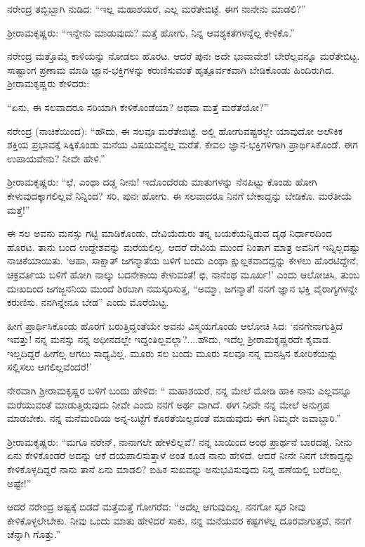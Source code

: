 ನರೇಂದ್ರ ತಬ್ಬಿಬ್ಬಾಗಿ ನುಡಿದ: “ಇಲ್ಲ ಮಹಾಶಯರೆ, ಎಲ್ಲ ಮರೆತೇಬಿಟ್ಟೆ. ಈಗ ನಾನೇನು ಮಾಡಲಿ?”

ಶ್ರೀರಾಮಕೃಷ್ಣರು: “ಇನ್ನೇನು ಮಾಡುವುದು? ಮತ್ತೆ ಹೋಗು, ನಿನ್ನ ಆವಶ್ಯಕತೆಗಳನ್ನೆಲ್ಲ ಕೇಳಿಕೊ.”

ನರೇಂದ್ರ ಮತ್ತೊಮ್ಮೆ ಕಾಳಿಯನ್ನು ನೋಡಲು ಹೊರಟ. ಆದರೆ ಪುನಃ ಅದೇ ಭಾವಾವೇಶ! ಬೇರೆಲ್ಲವನ್ನೂ ಮರೆತೇಬಿಟ್ಟ. ಸಾಷ್ಟಾಂಗ ಪ್ರಣಾಮ ಮಾಡಿ ಜ್ಞಾನ-ಭಕ್ತಿಗಳನ್ನು ಕರುಣಿಸುವಂತೆ ಹೃತ್ಪೂರ್ವಕವಾಗಿ ಬೇಡಿಕೊಂಡು ಹಿಂದಿರುಗಿದ. ಶ್ರೀರಾಮಕೃಷ್ಣರು ಕೇಳಿದರು:

“ಏನು, ಈ ಸಲವಾದರೂ ಸರಿಯಾಗಿ ಕೇಳಿಕೊಂಡೆಯಾ? ಅಥವಾ ಮತ್ತೆ ಮರೆತೆಯೋ?”

ನರೇಂದ್ರ (ನಾಚಿಕೆಯಿಂದ): “ಹೌದು, ಈ ಸಲವೂ ಮರೆತೇಬಿಟ್ಟೆ. ಅಲ್ಲಿ ಹೋಗುವಷ್ಟರಲ್ಲೇ ಯಾವುದೋ ಅಲೌಕಿಕ ಶಕ್ತಿಯ ಪ್ರಭಾವಕ್ಕೆ ಸಿಕ್ಕಿಕೊಂಡು ಮನೆಯ ವಿಷಯವನ್ನೆಲ್ಲ ಮರೆತೆ. ಕೇವಲ ಜ್ಞಾನ-ಭಕ್ತಿಗಳಿಗಾಗಿ ಪ್ರಾರ್ಥಿಸಿಕೊಂಡೆ. ಈಗ ಉಪಾಯವೇನು? ನೀವೇ ಹೇಳಿ.”

ಶ್ರೀರಾಮಕೃಷ್ಣರು: “ಛೆ, ಎಂಥಾ ದಡ್ಡ ನೀನು! ಇದೊಂದೆರಡು ಮಾತುಗಳನ್ನು ನೆನಪಿಟ್ಟು ಕೊಂಡು ಹೋಗಿ ಕೇಳುವುದಕ್ಕಾಗಲಿಲ್ಲವೆ ನಿನ್ನಿಂದ? ಸರಿ, ಪುನಃ ಹೋಗು. ಈ ಸಲವಾದರೂ ನಿನಗೆ ಬೇಕಾದ್ದನ್ನು ಬೇಡಿಕೊ. ಮರೆತೀಯೆ ಮತ್ತೆ!”

ಈ ಸಲ ಅವನು ಮನಸ್ಸು ಗಟ್ಟಿ ಮಾಡಿಕೊಂಡು, ದೇವಿಯೆದುರು ತನ್ನ ಬಯಕೆಯನ್ನಿಡುವ ದೃಢ ನಿರ್ಧಾರದಿಂದ ಹೊರಟ. ತಾನು ಬಂದ ಉದ್ದೇಶವನ್ನು ಮರೆಯಲಿಲ್ಲ. ಆದರೆ ದೇವಿಯ ಮುಂದೆ ನಿಂತಾಗ ಮಾತ್ರ ಅವನಿಗೆ ಇನ್ನಿಲ್ಲದಷ್ಟು ನಾಚಿಕೆಯಾಯಿತು. ‘ಆಹಾ, ಸಾಕ್ಷಾತ್ ಜಗನ್ಮಾತೆಯ ಬಳಿಗೆ ಬಂದು ಎಂಥಾ ಕ್ಷುಲ್ಲಕವಾದದ್ದನ್ನು ಕೇಳಲು ಹೊರಟಿದ್ದೇನೆ, ಚಕ್ರವರ್ತಿಯ ಬಳಿಗೆ ಹೋಗಿ ನಾಲ್ಕು ಬದನೇಕಾಯಿ ಕೇಳುವಂತೆ! ಛಿ, ನಾನೆಂಥ ಮೂರ್ಖ!’ ಎಂದು ಆಲೋಚಿಸಿ, ತುಂಬ ದುಃಖದಿಂದ ಜಗಜ್ಜನನಿಯ ಮುಂದೆ ಶಿರಬಾಗಿ ನಮಸ್ಕರಿಸುತ್ತ, “ಅಮ್ಮಾ, ಜಗನ್ಮಾತೆ! ನನಗೆ ಜ್ಞಾನ ಭಕ್ತಿ ವೈರಾಗ್ಯಗಳನ್ನೇ ಕರುಣಿಸು. ನನಗಿನ್ನೇನೂ ಬೇಡ” ಎಂದು ಮೊರೆಯಿಟ್ಟ.

ಹೀಗೆ ಪ್ರಾರ್ಥಿಸಿಕೊಂಡು ಹೊರಗೆ ಬರುತ್ತಿದ್ದಂತೆಯೇ ಅವನು ವಿಸ್ಮಯಗೊಂಡು ಆಲೋಚಿ ಸಿದ: ‘ನನಗೇನಾಗುತ್ತಿದೆ ಇವತ್ತು! ನನ್ನ ಮನಸ್ಸು ನನ್ನ ಅಧೀನದಲ್ಲೇ ಇದ್ದಂತಿಲ್ಲವಲ್ಲಾ?....ಹೌದು, ಇದೆಲ್ಲ ಶ್ರೀರಾಮಕೃಷ್ಣರದೇ ಕೈವಾಡ. ಇಲ್ಲದಿದ್ದರೆ ಹೀಗೆಲ್ಲ ಆಗಲು ಸಾಧ್ಯವಿಲ್ಲ. ಮೂರು ಸಲ ಬಂದು ಮೂರು ಸಲವೂ ನನ್ನ ಮನಸ್ಸಿನ ಕೋರಿಕೆಯನ್ನು ಸಲ್ಲಿಸಲು ಆಗಲಿಲ್ಲವೆಂದರೆ!’

ನೇರವಾಗಿ ಶ್ರೀರಾಮಕೃಷ್ಣರ ಬಳಿಗೆ ಬಂದು ಹೇಳಿದ: “ ಮಹಾಶಯರೆ, ನನ್ನ ಮೇಲೆ ಮೋಡಿ ಹಾಕಿ ನಾನು ಎಲ್ಲವನ್ನೂ ಮರೆಯುವಂತೆ ಮಾಡುತ್ತಿರುವುದು ನೀವೇ ಎಂದು ನನಗೆ ಅರ್ಥ ವಾಗಿದೆ. ಈಗ ನೀವೇ ನನ್ನ ಮೇಲೆ ಅನುಗ್ರಹ ಮಾಡಬೇಕು. ನನ್ನ ಮನೆಮಂದಿಯ ಅನ್ನ-ಬಟ್ಟೆಗೆ ಕೊರತೆಯಿಲ್ಲದಂತೆ ಮಾಡುವುದು ಈಗ ನಿಮ್ಮದೇ ಜವಾಬ್ದಾರಿ.”

ಶ್ರೀರಾಮಕೃಷ್ಣರು: “ಮಗೂ ನರೇನ್, ನಾನಾಗಲೇ ಹೇಳಲಿಲ್ಲವೆ? ನನ್ನ ಬಾಯಿಂದ ಅಂಥ ಪ್ರಾರ್ಥನೆ ಬಾರದಪ್ಪ. ನೀನು ಏನು ಕೇಳಿಕೊಂಡರೆ ಅದನ್ನು ಆಕೆ ದಯಪಾಲಿಸುತ್ತಾಳೆ ಅಂತ ಕೂಡ ನಾನು ಹೇಳಿದೆ. ಆದರೆ ನೀನೇ ನಿನಗೆ ಬೇಕಾದ್ದನ್ನು ಕೇಳಿಕೊಳ್ಳದಿದ್ದರೆ ನಾನು ತಾನೆ ಏನು ಮಾಡಲಿ? ಐಹಿಕ ಸುಖವನ್ನು ಅನುಭವಿಸುವುದು ನಿನ್ನ ಹಣೆಯಲ್ಲಿ ಬರೆದಿಲ್ಲ, ಅಷ್ಟೇ!”

ಆದರೆ ನರೇಂದ್ರ ಅಷ್ಟಕ್ಕೆ ಬಿಡದೆ ಮತ್ತೆಮತ್ತೆ ಗೋಗರೆದ: “ಅದೆಲ್ಲ ಆಗುವುದಿಲ್ಲ. ನನಗೋ ಸ್ಕರ ನೀವು ಕೇಳಿಕೊಳ್ಳಲೇಬೇಕು. ನೀವು ಒಂದು ಮಾತು ಹೇಳಿದರೆ ಸಾಕು, ನನ್ನ ಮನೆಯವರ ಕಷ್ಟಗಳೆಲ್ಲ ದೂರವಾಗುತ್ತವೆ, ನನಗೆ ಚೆನ್ನಾಗಿ ಗೊತ್ತು.”

